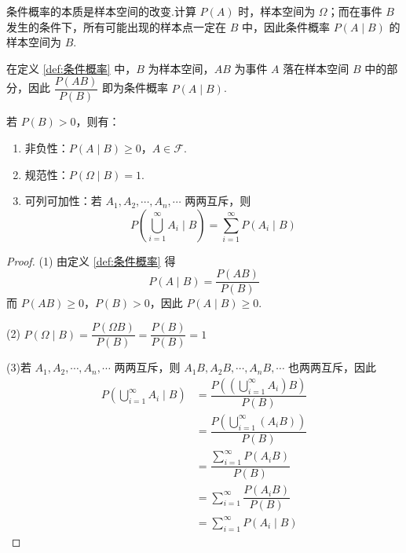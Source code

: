 \begin{note}
    \indent 条件概率的本质是样本空间的改变.计算 $P(A)$ 时，样本空间为 $\varOmega$；而在事件 $B$ 发生的条件下，所有可能出现的样本点一定在 $B$ 中，因此条件概率 $P(A \mid B)$ 的样本空间为 $B$.

    在定义 \ref{def:条件概率} 中，$B$ 为样本空间，$AB$ 为事件 $A$ 落在样本空间 $B$ 中的部分，因此 $\dfrac{P(AB)}{P(B)}$ 即为条件概率 $P(A \mid B)$.
\end{note}

\begin{property}
    \indent 若 $P(B) > 0$，则有：
    \begin{enumerate}
        \item 非负性：$P(A \mid B) \geqslant 0$，$A \in \mathcal{F}$.
        \item 规范性：$P(\varOmega \mid B) = 1$.
        \item 可列可加性：若 $A_1, A_2, \cdots, A_n, \cdots$ 两两互斥，则
        $$
        P \left( \bigcup_{i=1}^{\infty} A_i \mid B \right) = \sum_{i=1}^{\infty} P(A_i \mid B)
        $$
    \end{enumerate}
\end{property}

\begin{proof}
    (1) 由定义 \ref{def:条件概率} 得
    $$P(A \mid B) = \dfrac{P(AB)}{P(B)}$$
    而 $P(AB) \geqslant 0$，$P(B)>0$，因此 $P(A \mid B) \geqslant 0$.

    \vspace{0.5em}

    (2) $P(\varOmega \mid B) = \dfrac{P(\varOmega B)}{P(B)} = \dfrac{P(B)}{P(B)} = 1$

    \vspace{0.5em}

    (3)若 $A_1, A_2, \cdots, A_n, \cdots$ 两两互斥，则 $A_1 B, A_2 B, \cdots, A_n B, \cdots$ 也两两互斥，因此
    $$
    \begin{aligned}
        P \left( \bigcup_{i=1}^{\infty} A_i \mid B \right) &= \dfrac{P \left( \left( \displaystyle\bigcup_{i=1}^{\infty} A_i \right) B \right)}{P(B)} \\
        &= \dfrac{P \left( \displaystyle\bigcup_{i=1}^{\infty} (A_i B) \right)}{P(B)} \\
        &= \dfrac{\displaystyle\sum_{i=1}^{\infty} P(A_i B)}{P(B)} \\
        &= \sum_{i=1}^{\infty} \dfrac{P(A_i B)}{P(B)} \\
        &= \sum_{i=1}^{\infty} P(A_i \mid B)
    \end{aligned}
    $$

    \vspace{-2em}
\end{proof}

